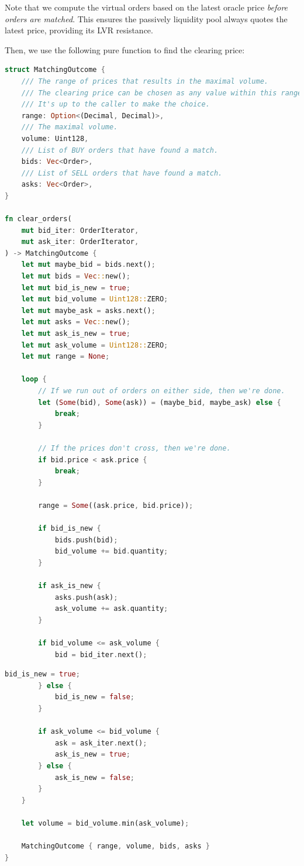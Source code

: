\documentclass{article}
\begin{document}
Note that we compute the virtual orders based on the latest oracle price \textit{before orders are matched}. This ensures the passively liquidity pool always quotes the latest price, providing its LVR resistance.

Then, we use the following pure function to find the clearing price:

\begin{minipage}{\linewidth}
  \vspace*{0.1in}
  \begin{lstlisting}[language=rust]
struct MatchingOutcome {
    /// The range of prices that results in the maximal volume.
    /// The clearing price can be chosen as any value within this range.
    /// It's up to the caller to make the choice.
    range: Option<(Decimal, Decimal)>,
    /// The maximal volume.
    volume: Uint128,
    /// List of BUY orders that have found a match.
    bids: Vec<Order>,
    /// List of SELL orders that have found a match.
    asks: Vec<Order>,
}

fn clear_orders(
    mut bid_iter: OrderIterator,
    mut ask_iter: OrderIterator,
) -> MatchingOutcome {
    let mut maybe_bid = bids.next();
    let mut bids = Vec::new();
    let mut bid_is_new = true;
    let mut bid_volume = Uint128::ZERO;
    let mut maybe_ask = asks.next();
    let mut asks = Vec::new();
    let mut ask_is_new = true;
    let mut ask_volume = Uint128::ZERO;
    let mut range = None;

    loop {
        // If we run out of orders on either side, then we're done.
        let (Some(bid), Some(ask)) = (maybe_bid, maybe_ask) else {
            break;
        }

        // If the prices don't cross, then we're done.
        if bid.price < ask.price {
            break;
        }

        range = Some((ask.price, bid.price));

        if bid_is_new {
            bids.push(bid);
            bid_volume += bid.quantity;
        }

        if ask_is_new {
            asks.push(ask);
            ask_volume += ask.quantity;
        }

        if bid_volume <= ask_volume {
            bid = bid_iter.next();
  \end{lstlisting}
\end{minipage}

\begin{minipage}{\linewidth}
  \vspace*{0.1in}
  \begin{lstlisting}[language=rust]
            bid_is_new = true;
        } else {
            bid_is_new = false;
        }

        if ask_volume <= bid_volume {
            ask = ask_iter.next();
            ask_is_new = true;
        } else {
            ask_is_new = false;
        }
    }

    let volume = bid_volume.min(ask_volume);

    MatchingOutcome { range, volume, bids, asks }
}
  \end{lstlisting}
\end{minipage}
\end{document}
